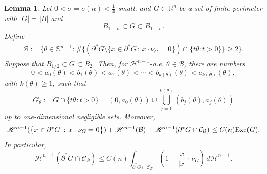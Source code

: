 \documentclass[reqno,11pt]{amsart}
\makeatletter
\def\sz{\sigma}
\newtheorem{lem}[thm]{Lemma}%
\numberwithin{equation}{section}
\theoremstyle{remark}
\makeatother
\begin{document}
\begin{lem}\label{small oscillation}
Let $0<\sz=\sz(n)<\frac 1 {4}$ small, and $G\subset \mathbb R^n$ be a set of finite perimeter with $|G|=|B|$ and
$$B_{1-\sigma}\subset G\subset B_{1+\sigma}.$$ 
Define
\begin{align*}
 \mathcal B:=\big\{\theta\in \mathbb S^{n-1}\colon \#\big\{(\partial^*G\setminus \big\{x \in \partial^*G\,:\, x\cdot \nu_{G}=0\big\})\cap \{t\theta\colon t>0\}\big\}\ge 2\big\}.
\end{align*}
Suppose that
 $B_{1/2}\subset G\subset B_2$.
Then, for $\mathscr H^{n-1}$-a.e. $\theta\in\mathcal B$, there are numbers
$$
0<a_0(\theta)<b_1(\theta)<a_1(\theta)<\cdots < b_{k(\theta)}(\theta)<a_{k(\theta)}(\theta),
$$
with $k(\theta)\ge1$, such that
\begin{equation}
\label{eq:ray-decomposition-leveling}
G_\theta:=G\cap\{t\theta:t>0\}
 =
 (0,a_0(\theta))\cup\bigcup_{j=1}^{k(\theta)}(b_j(\theta),a_j(\theta))
\end{equation}
up to one-dimensional negligible sets. 
Moreover,
  \begin{equation}\label{eq:exc G5}
\mathscr H^{n-1}(\big\{x \in \partial^*G\,:\, x\cdot \nu_{G}=0\big\} )+\mathscr H^{n-1}(\mathcal B ) +\mathscr H^{n-1}(\partial^*G \cap \mathcal{C}_{\mathcal B }) \leq C(n) {\rm Exc}(G ).
\end{equation} 
In particular, 
\begin{equation}\label{eq:exc G6}
  \mathscr H^{n-1}(\partial^*G \cap \mathcal{C}_{\mathcal B }) \le C(n) \int_{\partial^*G\cap \mathcal C_{\mathcal B}}  \left(1-\frac{x}{|x|}\cdot \nu_G \right)\, d\mathscr H^{n-1}.
\end{equation}
\end{lem}
\end{document}
